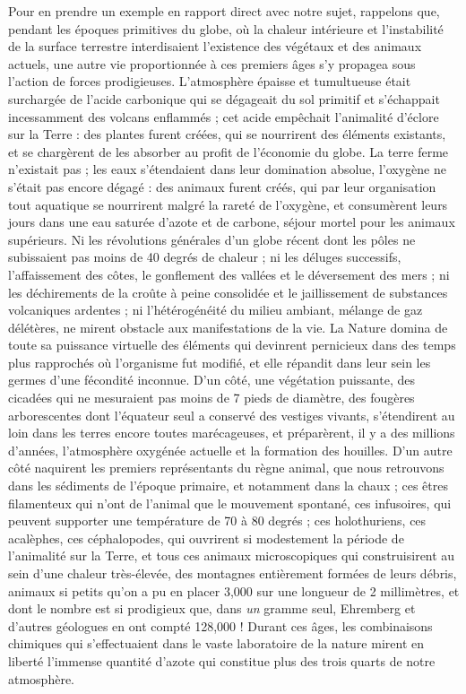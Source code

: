 \documentclass[a4paper, 11pt, oneside, landscape]{article}
\begin{document}
Pour en prendre un exemple en rapport direct avec notre sujet, rappelons que, pendant les époques primitives du globe, où la chaleur intérieure et l'instabilité de la surface terrestre interdisaient l'existence des végétaux et des animaux actuels, une autre vie proportionnée à ces premiers âges s'y propagea sous l'action de forces prodigieuses. L'atmosphère épaisse et tumultueuse était surchargée de l'acide carbonique qui se dégageait du sol primitif et s'échappait incessamment des volcans enflammés ; cet acide empêchait l'animalité d'éclore sur la Terre : des plantes furent créées, qui se nourrirent des éléments existants, et se chargèrent de les absorber au profit de l'économie du globe. La terre ferme n'existait pas ; les eaux s'étendaient dans leur domination absolue, l'oxygène ne s'était pas encore dégagé : des animaux furent créés, qui par leur organisation tout aquatique se nourrirent malgré la rareté de l'oxygène, et consumèrent leurs jours dans une eau saturée d'azote et de carbone, séjour mortel pour les animaux supérieurs. Ni les révolutions générales d'un globe récent dont les pôles ne subissaient pas moins de 40 degrés de chaleur ; ni les déluges successifs, l'affaissement des côtes, le gonflement des vallées et le déversement des mers ; ni les déchirements de la croûte à peine consolidée et le jaillissement de substances volcaniques ardentes ; ni l'hétérogénéité du milieu ambiant, mélange de gaz délétères, ne mirent obstacle aux manifestations de la vie. La Nature domina de toute sa puissance virtuelle des éléments qui devinrent pernicieux dans des temps plus rapprochés où l'organisme fut modifié, et elle répandit dans leur sein les germes d'une fécondité inconnue. D'un côté, une végétation puissante, des cicadées qui ne mesuraient pas moins de 7 pieds de diamètre, des fougères arborescentes dont l'équateur seul a conservé des vestiges vivants, s'étendirent au loin dans les terres encore toutes marécageuses, et préparèrent, il y a des millions d'années, l'atmosphère oxygénée actuelle et la formation des houilles. D'un autre côté naquirent les premiers représentants du règne animal, que nous retrouvons dans les sédiments de l'époque primaire, et notamment dans la chaux ; ces êtres filamenteux qui n'ont de l'animal que le mouvement spontané, ces infusoires, qui peuvent supporter une température de 70 à 80 degrés ; ces holothuriens, ces acalèphes, ces céphalopodes, qui ouvrirent si modestement la période de l'animalité sur la Terre, et tous ces animaux microscopiques qui construisirent au sein d'une chaleur très-élevée, des montagnes entièrement formées de leurs débris, animaux si petits qu'on a pu en placer 3,000 sur une longueur de 2 millimètres, et dont le nombre est si prodigieux que, dans \emph{un} gramme seul, Ehremberg et d'autres géologues en ont compté 128,000 ! Durant ces âges, les combinaisons chimiques qui s'effectuaient dans le vaste laboratoire de la nature mirent en liberté l'immense quantité d'azote qui constitue plus des trois quarts de notre atmosphère.
\end{document}
